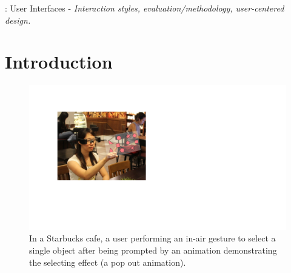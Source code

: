 \documentclass{sigchi}
\begin{document}

: User Interfaces - \emph{Interaction styles, evaluation/methodology, user-centered design.}



\section{Introduction}

 \begin{figure}[!h]
  \centering
  \includegraphics[width=1\columnwidth]{TopFigure2.pdf}
  \caption{In a Starbucks cafe, a user performing an in-air gesture to select a single object after being prompted by an animation demonstrating the selecting effect (a pop out animation).}
  \label{fig:TopFigure}
  \end{figure} 
\end{document}

